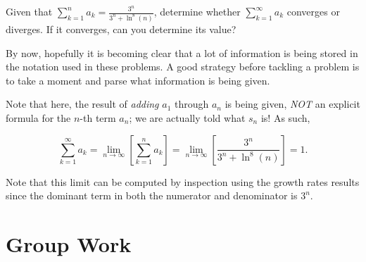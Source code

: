\documentclass[noauthor]{ximera}
\begin{document}

\begin{problem}
Given that $\sum_{k=1}^n a_k = \frac{3^n}{3^n+\ln^8(n)}$, determine whether $\sum_{k=1}^{\infty} a_k $ converges or diverges.  If it converges, can you determine its value?

\begin{freeResponse}
By now, hopefully it is becoming clear that a lot of information is being stored in the notation used in these problems.  A good strategy before tackling a problem is to take a moment and parse what information is being given.

Note that here, the result of \emph{adding} $a_1$ through $a_n$ is being given, \emph{NOT} an explicit formula for the $n$-th term $a_n$; we are actually told what $s_n$ is!  As such, 

\[
\sum_{k=1}^{\infty} a_k = \lim_{n \to \infty} \left[ \sum_{k=1}^n a_k \right] = \lim_{n \to \infty} \left[ \frac{3^n}{3^n+\ln^8(n)} \right] =1. 
\]

Note that this limit can be computed by inspection using the growth rates results since the dominant term in both the numerator and denominator is $3^n$.
\end{freeResponse}

\end{problem}


\section{Group Work}
\end{document}
